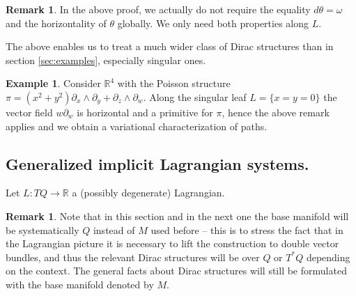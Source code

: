 \documentclass[a4paper,12pt]{amsart}
\theoremstyle{definition}
\newtheorem{Remark}[Definition]{Remark}
\newtheorem{Example}[Definition]{Example}
\newcommand{\leaf}[0]{{N}}
\newcommand{\R}{\mathbb{R}}
\begin{document}
\begin{Remark}
In the above proof, we actually do not require the equality $d\theta=\omega$ and the horizontality of $\theta$ globally. We only need both properties along $L$. 
\end{Remark}

The above enables us to treat a much wider class of Dirac structures than in section \ref{sec:examples}, especially singular ones.

\begin{Example}
Consider $\mathbb R^4$ with the Poisson structure \\$\pi=(x^2+y^2)\partial_x\wedge \partial_y+ \partial_z\wedge \partial_w$. Along the singular leaf $L=\{x=y=0\}$ the vector field $w\partial_w$ is horizontal and a primitive for $\pi$, hence the above remark applies and we obtain a variational characterization of paths. 
\end{Example}


\iffalse
XXXXX
\begin{align*}
& \left. \frac{\partial}{\partial s}\right|_0 \int_{t \in I} \left( \theta_\leaf|_{v_s(t)} \left(\frac{\partial{ v_s}}{\partial t }(t)\right)+H(v_s(t)) \right)dt \\ &= \int \left. \frac{\partial}{\partial s}\right|_0(v^*\theta_\leaf +v^*H )dt\\
&= \int (\gamma^*L_Y\theta_\leaf +\gamma^*L_YH)dt\\ &= \int (\gamma^*\iota_Yd\theta_\leaf +\gamma^*d\iota_Y\theta_\leaf   +\gamma^*\iota_Y dH) dt\\
&= \int d\theta_\leaf(Y,\dot\gamma)+dH(Y) dt. \end{align*}
In the last equality, we used the fact that $Y(0)=0$ and $Y(1)=0$ since the endpoints of $v$ are fixed.
The final expression vanishes for all infinitesimal variations $Y$ if and only if $\iota_{\dot \gamma}d\theta_\leaf=dH$. 
\fi




\subsection{Generalized implicit Lagrangian systems.}
\label{ILS}


Let $L\colon TQ \to \R$ a (possibly degenerate) Lagrangian.

{
\begin{Remark}
Note that in this section and in the next one the base manifold will be systematically $Q$ instead of $M$ used before -- this is to stress the fact that in the Lagrangian picture it is necessary to lift the construction to double vector bundles, and thus the relevant Dirac structures will be over $Q$ or $T^*Q$ depending on the context. The general facts about Dirac structures will still be formulated with the base manifold denoted by $M$.
\end{Remark}
}
\end{document}
